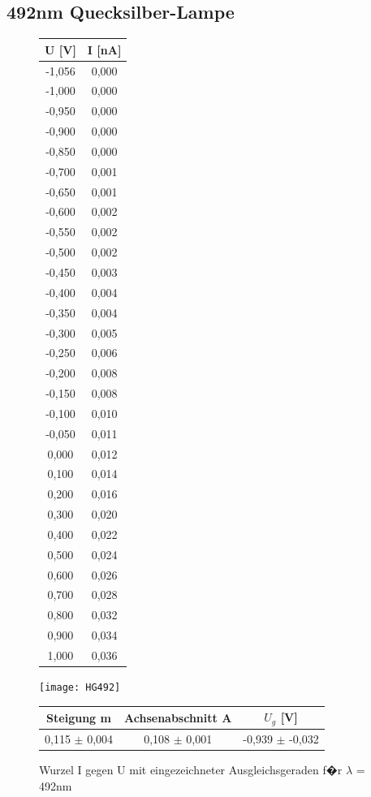 \documentclass[a4paper, 10pt]{report}%
\begin{document}
\newpage
\subsection{492nm Quecksilber-Lampe}
\begin{figure}[!htbp]
\begin{minipage}[t]{2cm}
\vspace{0pt}
\centering
\begin{center}
\begin{tabular}{c|c}
U [V] & I [nA] \\
\hline
-1,056&	0,000 \\
-1,000&	0,000 \\
-0,950&	0,000 \\
-0,900&	0,000 \\
-0,850&	0,000 \\
-0,700&	0,001 \\
-0,650&	0,001 \\
-0,600&	0,002 \\
-0,550&	0,002 \\
-0,500&	0,002 \\
-0,450&	0,003 \\
-0,400&	0,004 \\
-0,350&	0,004 \\
-0,300&	0,005 \\
-0,250&	0,006 \\
-0,200&	0,008 \\
-0,150&	0,008 \\
-0,100&	0,010 \\
-0,050&	0,011 \\
0,000&	0,012 \\
0,100&	0,014 \\
0,200&	0,016 \\
0,300&	0,020 \\
0,400&	0,022 \\
0,500&	0,024 \\
0,600&	0,026 \\
0,700&	0,028 \\
0,800&	0,032 \\
0,900&	0,034 \\
1,000&	0,036
\end{tabular}
\end{center}
\end{minipage}
\hfill
\begin{minipage}[t]{12cm}
\vspace{0pt}
\texttt{[image: HG492]}
\caption{Wurzel I gegen U mit eingezeichneter Ausgleichsgeraden f�r $\lambda$ = 492nm}
\begin{center}
\begin{tabular}{c|c|c}
Steigung m & Achsenabschnitt A & $U_g$ [V]\\
\hline
0,115 $\pm$ 0,004 & 0,108 $\pm$	0,001 & -0,939 $\pm$	-0,032
\end{tabular}
\end{center}
\end{minipage}
\end{figure}
\end{document}

